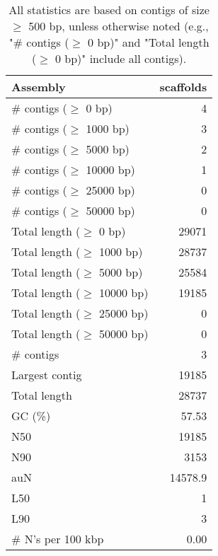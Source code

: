 \documentclass[12pt,a4paper]{article}
\begin{document}
\begin{table}[ht]
\begin{center}
\caption{All statistics are based on contigs of size $\geq$ 500 bp, unless otherwise noted (e.g., "\# contigs ($\geq$ 0 bp)" and "Total length ($\geq$ 0 bp)" include all contigs).}
\begin{tabular}{|l*{1}{|r}|}
\hline
Assembly & scaffolds \\ \hline
\# contigs ($\geq$ 0 bp) & 4 \\ \hline
\# contigs ($\geq$ 1000 bp) & 3 \\ \hline
\# contigs ($\geq$ 5000 bp) & 2 \\ \hline
\# contigs ($\geq$ 10000 bp) & 1 \\ \hline
\# contigs ($\geq$ 25000 bp) & 0 \\ \hline
\# contigs ($\geq$ 50000 bp) & 0 \\ \hline
Total length ($\geq$ 0 bp) & 29071 \\ \hline
Total length ($\geq$ 1000 bp) & 28737 \\ \hline
Total length ($\geq$ 5000 bp) & 25584 \\ \hline
Total length ($\geq$ 10000 bp) & 19185 \\ \hline
Total length ($\geq$ 25000 bp) & 0 \\ \hline
Total length ($\geq$ 50000 bp) & 0 \\ \hline
\# contigs & 3 \\ \hline
Largest contig & 19185 \\ \hline
Total length & 28737 \\ \hline
GC (\%) & 57.53 \\ \hline
N50 & 19185 \\ \hline
N90 & 3153 \\ \hline
auN & 14578.9 \\ \hline
L50 & 1 \\ \hline
L90 & 3 \\ \hline
\# N's per 100 kbp & 0.00 \\ \hline
\end{tabular}
\end{center}
\end{table}
\end{document}
